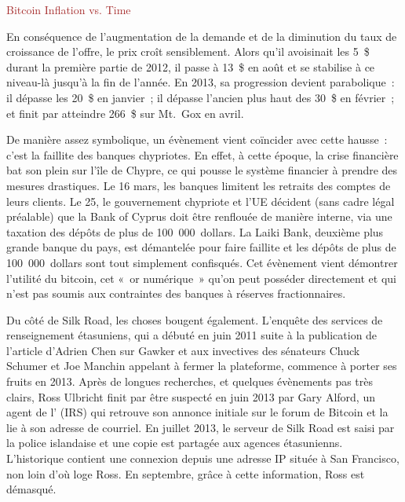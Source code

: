 \textcolor{brown}{Bitcoin Inflation vs. Time}

En conséquence de l'augmentation de la demande et de la diminution du taux de croissance de l'offre, le prix croît sensiblement. Alors qu'il avoisinait les 5~\$ durant la première partie de 2012, il passe à 13~\$ en août et se stabilise à ce niveau-là jusqu'à la fin de l'année. En 2013, sa progression devient parabolique~: il dépasse les 20~\$ en janvier~; il dépasse l'ancien plus haut des 30~\$ en février~; et finit par atteindre 266~\$ sur Mt.~Gox en avril.

De manière assez symbolique, un évènement vient coïncider avec cette hausse~: c'est la faillite des banques chypriotes. En effet, à cette époque, la crise financière bat son plein sur l'île de Chypre, ce qui pousse le système financier à prendre des mesures drastiques. Le 16 mars, les banques limitent les retraits des comptes de leurs clients. Le 25, le gouvernement chypriote et l'UE décident (sans cadre légal préalable) que la Bank of Cyprus doit être renflouée de manière interne, via une taxation des dépôts de plus de 100~000~dollars. La Laiki Bank, deuxième plus grande banque du pays, est démantelée pour faire faillite et les dépôts de plus de 100~000~dollars sont tout simplement confisqués. Cet évènement vient démontrer l'utilité du bitcoin, cet «~or numérique~» qu'on peut posséder directement et qui n'est pas soumis aux contraintes des banques à réserves fractionnaires.

Du côté de Silk Road, les choses bougent également. L'enquête des services de renseignement étasuniens, qui a débuté en juin 2011 suite à la publication de l'article d'Adrien Chen sur Gawker et aux invectives des sénateurs Chuck Schumer et Joe Manchin appelant à fermer la plateforme, commence à porter ses fruits en 2013. Après de longues recherches, et quelques évènements pas très clairs, Ross Ulbricht finit par être suspecté en juin 2013 par Gary Alford, un agent de l' (IRS) qui retrouve son annonce initiale sur le forum de Bitcoin et la lie à son adresse de courriel. En juillet 2013, le serveur de Silk Road est saisi par la police islandaise et une copie est partagée aux agences étasunienns. L'historique contient une connexion depuis une adresse IP située à San Francisco, non loin d'où loge Ross. En septembre, grâce à cette information, Ross est démasqué.

